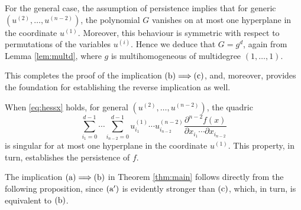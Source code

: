 \documentclass[aps,floatfix,groupedaddress,superscriptaddress,longbibliography,footinbib,notitlepage,showpacs]{revtex4-1}
\begin{document}
For the general case, the assumption of persistence implies that for generic $(u^{(2)}, \ldots, u^{(n-2)})$, the polynomial $G$ vanishes on at most one hyperplane in the coordinate $u^{(1)}$. Moreover, this behaviour is symmetric with respect to permutations of the variables $u^{(i)}$. Hence we deduce that $G=g^d$, again from Lemma \ref{lem:multd}, where $g$ is multihomogeneous of multidegree $(1,\ldots,1)$.

This completes the proof of the implication $(\textnormal{b}) \Longrightarrow (\textnormal{c})$, and, moreover, provides the foundation for establishing the reverse implication as well.

When \eqref{eq:hessx} holds, for general $(u^{(2)}, \ldots, u^{(n-2)})$, the quadric
\begin{equation}
\sum_{i_1=0}^{d-1}\cdots\sum_{i_{n-2}=0}^{d-1} u^{(1)}_{i_1}\cdots u^{(n-2)}_{i_{n-2}}
\frac{\partial^{n-2}f(x)}{\partial x_{i_1}\cdots\partial {x_{i_{n-2}}}}
\end{equation}
is singular for at most one hyperplane in the coordinate $u^{(1)}$. This property, in turn, establishes the persistence of $f$.

The implication $(\textnormal{a}) \Longrightarrow (\textnormal{b})$ in Theorem \ref{thm:main} follows directly from the following proposition, since $(\textnormal{a}^{\prime})$ is evidently stronger than $(\textnormal{c})$, which, in turn, is equivalent to $(\textnormal{b})$.
\end{document}
